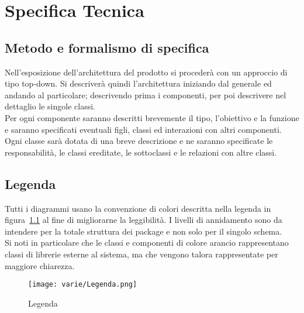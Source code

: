 
\chapter{Specifica Tecnica}\label{appendix:specifica_tecnica}
\section{Metodo e formalismo di specifica}
Nell'esposizione dell'architettura del prodotto si procederà con un approccio di tipo top-down.  Si descriverà quindi l'architettura iniziando dal generale ed andando al particolare; descrivendo prima i componenti, per poi descrivere nel dettaglio le singole classi.\\
Per ogni componente saranno descritti brevemente il tipo, l'obiettivo e la funzione e saranno specificati
eventuali figli, classi ed interazioni con altri componenti. Ogni classe sarà dotata di una breve descrizione e
ne saranno specificate le responsabilità, le classi ereditate, le sottoclassi e le relazioni con altre classi.

\section{Legenda}
Tutti i diagrammi usano la convenzione di colori descritta nella legenda in figura~\ref{fig:legenda} al fine di migliorarne la leggibilità. I livelli di annidamento sono da intendere per la totale struttura dei package e non solo per il singolo schema.\\
Si noti in particolare che le classi e componenti di colore arancio rappresentano classi di librerie esterne al sistema, ma che vengono talora rappresentate per maggiore chiarezza.
\begin{figure}[H] 
    \centering 
    \texttt{[image: varie/Legenda.png]} 
    \caption{Legenda}\label{fig:legenda}
\end{figure}

\newpage
